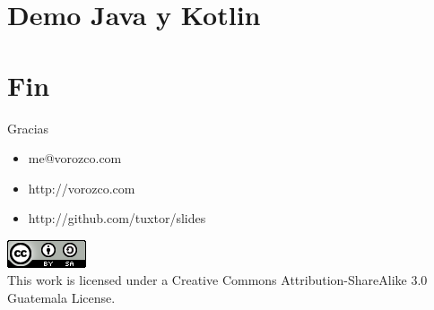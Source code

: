 \documentclass[14pt]{beamer}
\begin{document}
\section{Demo Java y Kotlin}

\section{Fin}
\begin{frame}{Gracias}
\begin{itemize}
	\item me@vorozco.com
	\item http://vorozco.com
	\item http://github.com/tuxtor/slides
\end{itemize}
\begin{center}
	\includegraphics[width=0.1\linewidth]{Images/cclogo}
	\\
	This work is licensed under a Creative Commons Attribution-ShareAlike 3.0 Guatemala License.
\end{center}
\end{frame}
\end{document}
